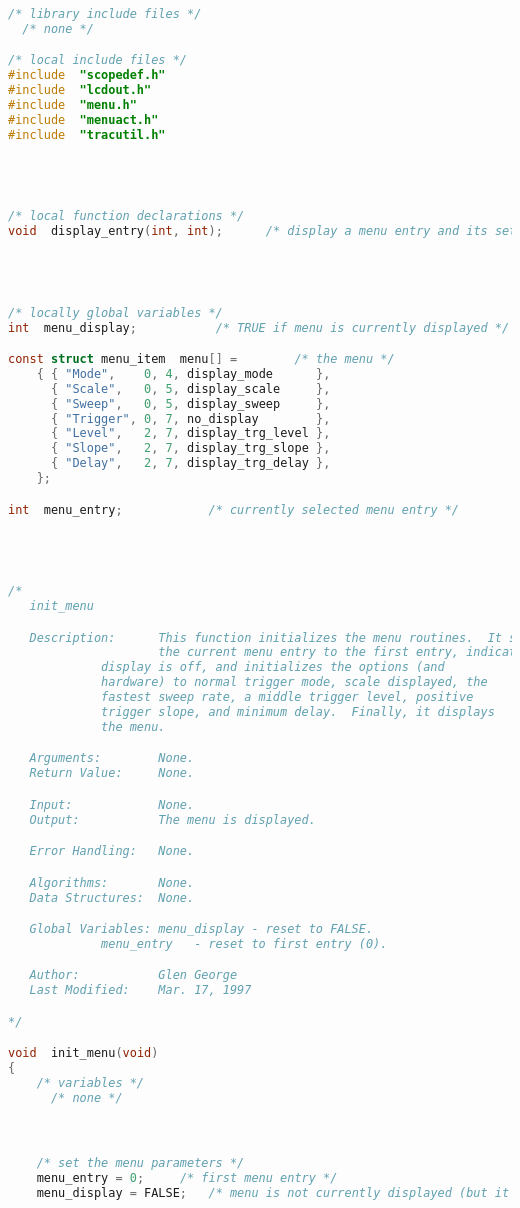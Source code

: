 \begin{lstlisting}[language=C]
/* library include files */
  /* none */

/* local include files */
#include  "scopedef.h"
#include  "lcdout.h"
#include  "menu.h"
#include  "menuact.h"
#include  "tracutil.h"




/* local function declarations */
void  display_entry(int, int);      /* display a menu entry and its setting */




/* locally global variables */
int  menu_display;           /* TRUE if menu is currently displayed */

const struct menu_item  menu[] =	    /* the menu */
    { { "Mode",    0, 4, display_mode      },
      { "Scale",   0, 5, display_scale     },
      { "Sweep",   0, 5, display_sweep     },
      { "Trigger", 0, 7, no_display        },
      { "Level",   2, 7, display_trg_level },
      { "Slope",   2, 7, display_trg_slope },
      { "Delay",   2, 7, display_trg_delay },
    };

int  menu_entry;		    /* currently selected menu entry */




/*
   init_menu

   Description:      This function initializes the menu routines.  It sets
                     the current menu entry to the first entry, indicates the
		     display is off, and initializes the options (and
		     hardware) to normal trigger mode, scale displayed, the
		     fastest sweep rate, a middle trigger level, positive
		     trigger slope, and minimum delay.  Finally, it displays
		     the menu.

   Arguments:        None.
   Return Value:     None.

   Input:            None.
   Output:           The menu is displayed.

   Error Handling:   None.

   Algorithms:       None.
   Data Structures:  None.

   Global Variables: menu_display - reset to FALSE.
   		     menu_entry   - reset to first entry (0).

   Author:           Glen George
   Last Modified:    Mar. 17, 1997

*/

void  init_menu(void)
{
    /* variables */
      /* none */



    /* set the menu parameters */
    menu_entry = 0;		/* first menu entry */
    menu_display = FALSE;	/* menu is not currently displayed (but it will be shortly) */



\end{lstlisting}
